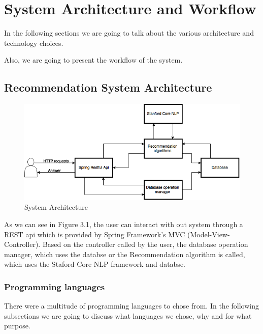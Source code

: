 \chapter{System Architecture and Workflow}
\label{chapter:system-architecture}

In the following sections we are going to talk about the various architecture and technology choices.

Also, we are going to present the workflow of the system.

\section{Recommendation System Architecture} 
\label{sec:architecture}

\begin{figure}[h]
\caption{System Architecture}
\includegraphics[width=1.0\textwidth]{src/img/architecture.png}
\end{figure}

As we can see in Figure 3.1, the user can interact with out system through a REST api which is provided by Spring Framework's MVC (Model-View-Controller). Based on the controller called by the user, the database operation manager, which uses the databse or the Recommendation algorithm is called, which uses the Staford Core NLP framework and databse. 

\subsection{Programming languages}
\label{sec:programming-languages}
There were a multitude of programming languages to chose from.
In the following subsections we are going to discuss what languages we chose, why and for what purpose.

